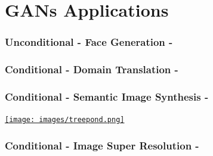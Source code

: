 \documentclass{beamer}
\begin{document}
\section{GANs Applications}

{
	\begin{frame}
		\frametitle{Unconditional - Face Generation - \cite{karrasProgressiveGrowingGANs2017}}
	\end{frame}
}

{
	\begin{frame}
		\frametitle{Conditional - Domain Translation - \cite{isolaImagetoImageTranslationConditional2016a}}
	\end{frame}
}


	\begin{frame}
		\frametitle{Conditional - Semantic Image Synthesis - \cite{parkSemanticImageSynthesis2019}}
		\href{run:images/treepond.mp4?autostart&loop&noprogress}{\texttt{[image: images/treepond.png]}}
	\end{frame}


{
	\begin{frame}
		\frametitle{Conditional - Image Super Resolution - \cite{ledigPhotoRealisticSingleImage2016}}
	\end{frame}
}
\end{document}
